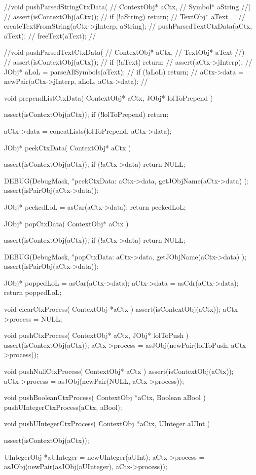 //void pushParsedStringCtxData(
//  ContextObj* aCtx,
//  Symbol* aString
//) {
//  assert(isContextObj(aCtx));
//  if (!aString) return;
//  TextObj* aText =
//    createTextFromString(aCtx->jInterp, aString);
//  pushParsedTextCtxData(aCtx, aText);
//  freeText(aText);
//}

//void pushParsedTextCtxData(
//  ContextObj* aCtx,
//  TextObj* aText
//) {
//  assert(isContextObj(aCtx));
//  if (!aText) return;
//  assert(aCtx->jInterp);
//  JObj* aLoL = parseAllSymbols(aText);
//  if (!aLoL) return;
//  aCtx->data = newPair(aCtx->jInterp, aLoL, aCtx->data);
//}

void prependListCtxData(
  ContextObj* aCtx,
  JObj* lolToPrepend
) {
  assert(isContextObj(aCtx));
  if (!lolToPrepend) return;

  aCtx->data =
    concatLists(lolToPrepend, aCtx->data);
}

JObj* peekCtxData(
  ContextObj* aCtx
) {
  assert(isContextObj(aCtx));
  if (!aCtx->data) return NULL;

  DEBUG(DebugMask, "peekCtxData: %
    aCtx->data, getJObjName(aCtx->data)
  );
  assert(isPairObj(aCtx->data));
 
  JObj* peekedLoL = asCar(aCtx->data);
  return peekedLoL;
}

JObj* popCtxData(
  ContextObj* aCtx
) {
  assert(isContextObj(aCtx));
  if (!aCtx->data) return NULL;

  DEBUG(DebugMask, "popCtxData: %
    aCtx->data, getJObjName(aCtx->data)
  );
  assert(isPairObj(aCtx->data));
 
  JObj* poppedLoL = asCar(aCtx->data);
  aCtx->data      = asCdr(aCtx->data);
  return poppedLoL;
}

void clearCtxProcess(
  ContextObj *aCtx
) {
  assert(isContextObj(aCtx));
  aCtx->process = NULL;
}

void pushCtxProcess(
  ContextObj* aCtx,
  JObj* lolToPush
) {
  assert(isContextObj(aCtx));
  aCtx->process =
    asJObj(newPair(lolToPush, aCtx->process));
}

void pushNullCtxProcess(
  ContextObj* aCtx
) {
  assert(isContextObj(aCtx));
  aCtx->process =
    asJObj(newPair(NULL, aCtx->process));
}

void pushBooleanCtxProcess(
  ContextObj *aCtx,
  Boolean     aBool
) {
  pushUIntegerCtxProcess(aCtx, aBool);
}

void pushUIntegerCtxProcess(
  ContextObj *aCtx,
  UInteger   aUInt
) {
  assert(isContextObj(aCtx));

  UIntegerObj *aUInteger = newUInteger(aUInt);
  aCtx->process =
    asJObj(newPair(asJObj(aUInteger), aCtx->process));
}

